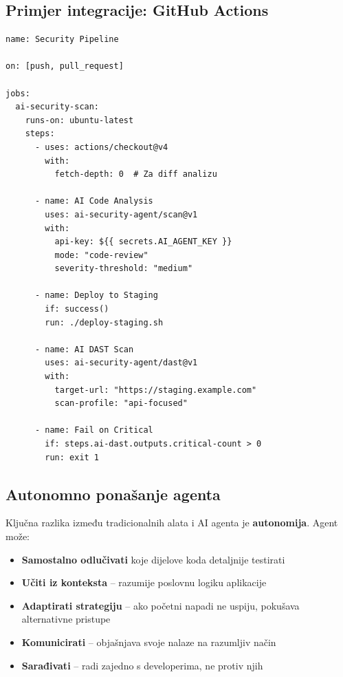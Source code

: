 \documentclass[12pt,a4paper]{article}
\begin{document}
\subsection{Primjer integracije: GitHub Actions}

\begin{lstlisting}[caption=Primjer GitHub Actions workflow-a sa AI sigurnosnim agentom]
name: Security Pipeline

on: [push, pull_request]

jobs:
  ai-security-scan:
    runs-on: ubuntu-latest
    steps:
      - uses: actions/checkout@v4
        with:
          fetch-depth: 0  # Za diff analizu
      
      - name: AI Code Analysis
        uses: ai-security-agent/scan@v1
        with:
          api-key: ${{ secrets.AI_AGENT_KEY }}
          mode: "code-review"
          severity-threshold: "medium"
      
      - name: Deploy to Staging
        if: success()
        run: ./deploy-staging.sh
      
      - name: AI DAST Scan
        uses: ai-security-agent/dast@v1
        with:
          target-url: "https://staging.example.com"
          scan-profile: "api-focused"
          
      - name: Fail on Critical
        if: steps.ai-dast.outputs.critical-count > 0
        run: exit 1
\end{lstlisting}

\subsection{Autonomno ponašanje agenta}

Ključna razlika između tradicionalnih alata i AI agenta je \textbf{autonomija}. Agent može:

\begin{itemize}
    \item \textbf{Samostalno odlučivati} koje dijelove koda detaljnije testirati
    \item \textbf{Učiti iz konteksta} -- razumije poslovnu logiku aplikacije
    \item \textbf{Adaptirati strategiju} -- ako početni napadi ne uspiju, pokušava alternativne pristupe
    \item \textbf{Komunicirati} -- objašnjava svoje nalaze na razumljiv način
    \item \textbf{Sarađivati} -- radi zajedno s developerima, ne protiv njih
\end{itemize}
\end{document}

